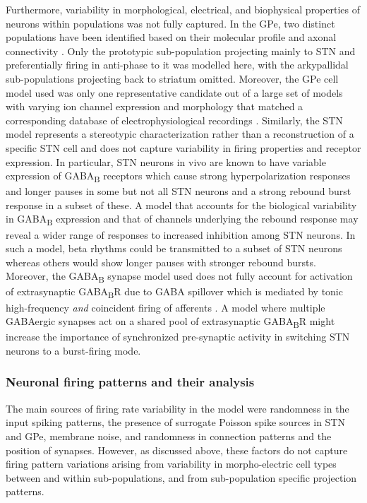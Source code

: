Furthermore, variability in morphological, electrical, and biophysical properties of neurons within
populations was not fully captured.
%
In the GPe, two distinct populations have been identified based on their molecular profile and axonal connectivity \cite{mallet_dichotomous_2012}. Only the prototypic sub-population projecting mainly to STN and preferentially firing in anti-phase to it was modelled here, with the arkypallidal sub-populations projecting back to striatum omitted. Moreover, the GPe cell model used was only one representative candidate out of a large set of models with varying ion channel expression and morphology that matched a corresponding database of electrophysiological recordings \cite{gunay_channel_2008}.
%
Similarly, the STN model represents a stereotypic characterization rather than a reconstruction of a specific STN cell and does not capture variability in firing properties and receptor expression. In particular, STN neurons in vivo are known to have variable expression of GABA\textsubscript{B} receptors \cite{galvan_differential_2004} which cause strong hyperpolarization responses and longer pauses in some but not all STN neurons \cite{hallworth_globus_2005} and a strong rebound burst response \cite{galvan_differential_2004} in a subset of these. A model that accounts for the biological variability in GABA\textsubscript{B} expression and that of channels underlying the rebound response may reveal a wider range of responses to increased inhibition among STN neurons. In such a model, beta rhythms could be transmitted to a subset of STN neurons whereas others would show longer pauses with stronger rebound bursts. Moreover, the GABA\textsubscript{B} synapse model used does not fully account for activation of extrasynaptic GABA\textsubscript{B}R due to GABA spillover \cite{galvan_differential_2004} which is mediated by tonic high-frequency \textit{and} coincident firing of afferents \cite{bevan_cellular_2006}. A model where multiple GABAergic synapses act on a shared pool of extrasynaptic GABA\textsubscript{B}R might increase the importance of synchronized pre-synaptic activity in switching STN neurons to a burst-firing mode.
%
%

\subsubsection*{Neuronal firing patterns and their analysis}

%
The main sources of firing rate variability in the model were randomness in the input spiking patterns, the presence of surrogate Poisson spike sources in STN and GPe, membrane noise, and randomness in connection patterns and the position of synapses. However, as discussed above, these factors do not capture firing pattern variations arising from variability in morpho-electric cell types between and within sub-populations, and from sub-population specific projection patterns.

